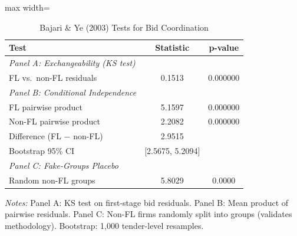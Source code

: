 \begin{table}[htbp]
\centering
\caption{Bajari \& Ye (2003) Tests for Bid Coordination}
\label{tab:bajari_ye}
\begin{adjustbox}{max width=\textwidth}
\begin{threeparttable}
\small
\begin{tabular}{lcc}
\toprule
Test & Statistic & p-value \\
\midrule
\textit{Panel A: Exchangeability (KS test)} & & \\
\quad FL vs.\ non-FL residuals & 0.1513 & 0.000000 \\
[6pt]
\textit{Panel B: Conditional Independence} & & \\
\quad FL pairwise product & 5.1597 & 0.000000 \\
\quad Non-FL pairwise product & 2.2082 & 0.000000 \\
\quad Difference (FL $-$ non-FL) & 2.9515 & \\
\quad Bootstrap 95\% CI & [2.5675, 5.2094] & \\
[6pt]
\textit{Panel C: Fake-Groups Placebo} & & \\
\quad Random non-FL groups & 5.8029 & 0.0000 \\
\bottomrule
\end{tabular}
\begin{tablenotes}
\small
\item \textit{Notes:} Panel A: KS test on first-stage bid residuals.
Panel B: Mean product of pairwise residuals.
Panel C: Non-FL firms randomly split into groups (validates methodology).
Bootstrap: 1,000 tender-level resamples.
\end{tablenotes}
\end{threeparttable}
\end{adjustbox}
\end{table}
